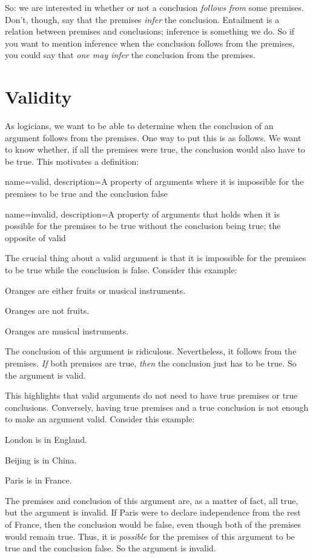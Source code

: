 So: we are interested in whether or not a conclusion \emph{follows from} some premises. Don't, though, say that the premises \emph{infer} the conclusion. Entailment is a relation between premises and conclusions; inference is something we do. So if you want to mention inference when the conclusion follows from the premises, you could say that \emph{one may infer} the conclusion from the premises.

\section{Validity}

As logicians, we want to be able to determine when the conclusion of an argument follows from the premises. One way to put this is as follows. We want to know whether, if all the premises were true, the conclusion would also have to be true. This motivates a definition:

{
name=valid,
description={A property of arguments where it is impossible for the premises to be true and the conclusion false}
}

{
name=invalid,
description={A property of arguments that holds when it is possible for the premises to be true without the conclusion being true; the opposite of \gls{valid}}
}
        
The crucial thing about a valid argument is that it is impossible for the premises to be true while the conclusion is false. Consider this example:
	\begin{earg}
		\item[] Oranges are either fruits or musical instruments.
		\item[] Oranges are not fruits.
		\item[\therefore] Oranges are musical instruments.
	\end{earg}
The conclusion of this argument is ridiculous. Nevertheless, it follows from the premises. \emph{If} both premises are true, \emph{then} the conclusion just has to be true. So the argument is valid. 

This highlights that valid arguments do not need to have true premises or true conclusions. Conversely, having true premises and a true conclusion is not enough to make an argument valid. Consider this example:
	\begin{earg}
		\item[] London is in England.
		\item[] Beijing is in China.
		\item[\therefore] Paris is in France.
	\end{earg}
The premises and conclusion of this argument are, as a matter of fact, all true, but the argument is invalid. If Paris were to declare independence from the rest of France, then the conclusion would be false, even though both of the premises would remain true. Thus, it is \emph{possible} for the premises of this argument to be true and the conclusion false. So the argument is invalid.

